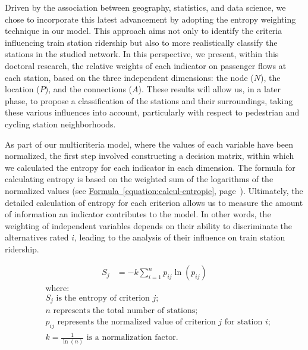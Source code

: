 \begin{refsegment}
Driven by the association between geography, statistics, and data science, we chose to incorporate this latest advancement by adopting the entropy weighting technique in our model. This approach aims not only to identify the criteria influencing train station ridership but also to more realistically classify the stations in the studied network. In this perspective, we present, within this doctoral research, the relative weights of each indicator on passenger flows at each station, based on the three independent dimensions: the node (\(N\)), the location (\(P\)), and the connections (\(A\)). These results will allow us, in a later phase, to propose a classification of the stations and their surroundings, taking these various influences into account, particularly with respect to pedestrian and cycling station neighborhoods.%

As part of our multicriteria model, where the values of each variable have been normalized, the first step involved constructing a decision matrix, within which we calculated the entropy for each indicator in each dimension. The formula for calculating entropy is based on the weighted sum of the logarithms of the normalized values (see \hyperref[equation:calcul-entropie]{Formula~\ref{equation:calcul-entropie}}, page~\pageref{equation:calcul-entropie}). Ultimately, the detailed calculation of entropy for each criterion allows us to measure the amount of information an indicator contributes to the model. In other words, the weighting of independent variables depends on their ability to discriminate the alternatives rated \(i\), leading to the analysis of their influence on train station ridership.%

\begin{equation}
\label{equation:calcul-entropie}
\begin{aligned}
S_j &= -k \sum\limits_{i=1}^{n} p_{ij} \ln(p_{ij})
\end{aligned}
\end{equation}
\begin{align*}
    &\text{where:} \\
    &S_j \text{~is the entropy of criterion } j\text{;}\\
    &n \text{~represents the total number of stations;}\\
    &p_{ij} \text{~represents the normalized value of criterion } j 
            \text{ for station } i\text{;}\\
    &k = \frac{1}{\ln(n)} \text{~is a normalization factor.}
\end{align*}%


\end{refsegment}
